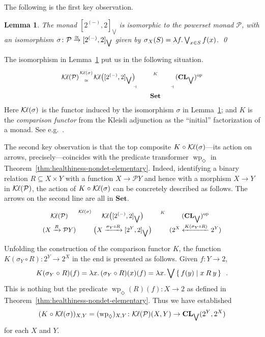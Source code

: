 \documentclass[9pt, preprint]{sigplanconf}
\theoremstyle{theorem}
\newtheorem{lemma}[theorem]{Lemma}
\theoremstyle{definition}
\newcommand{\pow}{\mathcal{P}}
\newcommand{\set}[2]{\left\{\, #1 \mathrel{}\middle|\mathrel{} #2 \,\right\}}
\newcommand{\place}{{-}}
\newcommand{\op}{\mathrm{op}}
\newcommand{\Set}{\mathbf{Set}}
\newcommand{\Sets}{\Set}
\newcommand{\CL}{\mathbf{CL}}
\newcommand{\Kl}{\mathcal{K}{\kern-.2ex}\ell}
\newcommand{\biglor}{\bigvee}
\newcommand{\co}{\mathrel{\circ}}
\newcommand{\wpre}{\mathop{\mathrm{wp}}\nolimits}
\begin{document}
The following  is the first key observation.
\begin{lemma}
  \label{lem:monad-isom-jslat}
  The monad  $[2^{(\place)}, 2]_{\biglor}$ is isomorphic to the powerset
 monad $\pow$, with an isomorphism
 $\sigma \colon \pow \iso [2^{(\place)}, 2]_{\biglor}$ given by
  $\sigma_X(S) = \lambda f \ldotp \biglor_{x \in S}  f(x)$.
  \qed
\end{lemma}
\noindent
 The isomorphism in Lemma~\ref{lem:monad-isom-jslat} put us in the
 following situation.
\begin{equation}\label{eq:stateEffectForDiamondWithSigmaExplicit}
  \small
  \vcenter{\xymatrix@R-1.5em@C-1em{
  \Kl(\pow)
\ar[r]^-{\Kl(\sigma)}_-{\cong}
  & {\Kl\bigl([2^{(\place)}, 2]_{\biglor}\bigr)}
      \ar[rr]^-{K} \ar@/^/[rd]
  && {(\CL_{\bigvee})^{\op}} \ar@/^/[ld] \\
  && {\Set} \ar@/^/[ul]^{} \ar@/^/[ur]_{} \ar@{}[ul]|{\dashv} \ar@{}[ur]|{\dashv}
  }}
\end{equation}
Here $\Kl(\sigma)$ is
the
 functor induced by the isomorphism $\sigma$ in
 Lemma~\ref{lem:monad-isom-jslat}; and $K$ is the \emph{comparison
 functor}
from the Kleisli adjunction as the
 ``initial'' factorization of a monad. See
 e.g.~\cite{MacLane71,BarrW85}.

The second key observation is that
 the top composite
$K\co \Kl(\sigma)$---its action on arrows, precisely---coincides
 with the predicate transformer $\wpre_{\Diamond}$ in
 Theorem~\ref{thm:healthiness-nondet-elementary}.
 Indeed, identifying a binary relation $R\subseteq X\times Y$ with
 a function $X\to \pow Y$ and hence with
 a morphism $X\to Y$ in $\Kl(\pow)$, the action of $K\co \Kl(\sigma)$ can
 be concretely described as follows. The arrows on the second line are all
 in $\Sets$.
\begin{align*}\small
  \xymatrix@R=-.3em@C=2em{
    \Kl(\pow)
\ar[r]^-{\Kl(\sigma)}
    & \Kl\bigl([2^{(\place)}, 2]_{\biglor}\bigr) \ar[r]^-{K}
    & (\CL_{\biglor})^{\op} \\
    (X \xrightarrow{R} \pow Y) \ar@{|->}[r]
    & \bigl(X \xrightarrow{\sigma_{Y}\co R} [2^{Y}, 2]_{\bigvee}\bigr) \ar@{|->}[r]
    & (2^X \xleftarrow{K(\sigma_{Y}\co R)} 2^Y)
}
\end{align*}
Unfolding the construction of the comparison functor $K$, the function
$K(\sigma_{Y}\co R)\colon 2^{Y}\to 2^{X}$ in the end is presented as follows.
Given $f\colon Y\to 2$,
\begin{align*}
K(\sigma_{Y}\co R)(f)
= \lambda x \ldotp (\sigma_Y \circ R)(x)(f)
= \lambda x \ldotp \biglor \set{f(y)}{x \mathbin{R} y} \enspace .
\end{align*}
This is nothing but the predicate $\wpre_{\Diamond}(R)(f)\colon X\to 2$ as
defined in Theorem~\ref{thm:healthiness-nondet-elementary}. Thus we have
established
\begin{displaymath}
 (K\co \Kl(\sigma))_{X,Y}=(\wpre_{\Diamond})_{X,Y}
 \colon
   \Kl(\pow)(X,Y) \to
   \CL_{\biglor}(2^{Y},2^{X})
\end{displaymath}
for each $X$ and $Y$.
\end{document}
